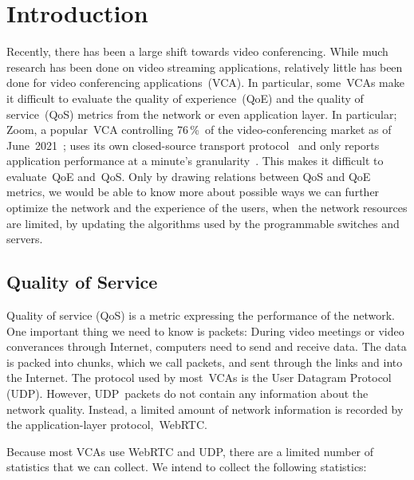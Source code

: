 \section{Introduction}\label{introduction}
    Recently, there has been a large shift towards video conferencing. While much research has been done on video streaming applications, relatively little has been done for video conferencing applications~(VCA). In particular, some~VCAs make it difficult to evaluate the quality of experience~(QoE) and the quality of service~(QoS) metrics from the network or even application layer. In particular; Zoom, a popular~VCA controlling 76\,\%~of the video-conferencing market as of June~2021~\autocite{kim2021}; uses its own closed-source transport protocol~\autocite{marczak2020} and only reports application performance at a minute's granularity~\autocite{walia2019}. This makes it difficult to evaluate~QoE and~QoS. Only by drawing relations between QoS and QoE metrics, we would be able to know more about possible ways we can further optimize the network and the experience of the users, when the network resources are limited, by updating the algorithms used by the programmable switches and servers.

    \subsection{Quality of Service}\label{introduction:qos}
        Quality of service (QoS) is a metric expressing the performance of the network. One important thing we need to know is packets: During video meetings or video converances through Internet, computers need to send and receive data. The data is packed into chunks, which we call packets, and sent through the links and into the Internet. The protocol used by most~VCAs is the User Datagram Protocol (UDP). However, UDP~packets do not contain any information about the network quality. Instead, a limited amount of network information is recorded by the application-layer protocol,~WebRTC.

        Because most VCAs use WebRTC and UDP, there are a limited number of statistics that we can collect. We intend to collect the following statistics:

